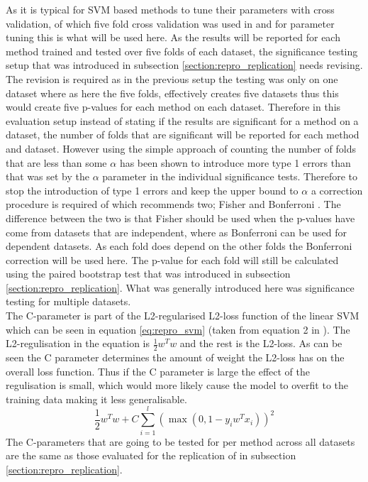 As it is typical for SVM based methods to tune their parameters with cross validation, of which five fold cross validation was used in \citet{vo2015target} and \citet{wang-etal-2017-tdparse} for parameter tuning this is what will be used here. As the results will be reported for each method trained and tested over five folds of each dataset, the significance testing setup that was introduced in subsection \ref{section:repro_replication} needs revising. The revision is required as in the previous setup the testing was only on one dataset where as here the five folds, effectively creates five datasets thus this would create five p-values for each method on each dataset. Therefore in this evaluation setup instead of stating if the results are significant for a method on a dataset, the number of folds that are significant will be reported for each method and dataset. However using the simple approach of counting the number of folds that are less than some $\alpha$ has been shown to introduce more type 1 errors \citep{dror-etal-2017-replicability} than that was set by the $\alpha$ parameter in the individual significance tests. Therefore to stop the introduction of type 1 errors and keep the upper bound to $\alpha$ a correction procedure is required of which \citet{dror-etal-2018-hitchhikers} recommends two; Fisher and Bonferroni \citep{benjamini2008screening}. The difference between the two is that Fisher should be used when the p-values have come from datasets that are independent, where as Bonferroni can be used for dependent datasets. As each fold does depend on the other folds the Bonferroni correction will be used here. The p-value for each fold will still be calculated using the paired bootstrap test that was introduced in subsection \ref{section:repro_replication}. What was generally introduced here was significance testing for multiple datasets.\\

The C-parameter is part of the L2-regularised L2-loss function of the linear SVM which can be seen in equation \ref{eq:repro_svm} (taken from equation 2 in \citep{fan2008liblinear}). The L2-regulisation in the equation is $\frac{1}{2}w^Tw$ and the rest is the L2-loss. As can be seen the C parameter determines the amount of weight the L2-loss has on the overall loss function. Thus if the C parameter is large the effect of the regulisation is small, which would more likely cause the model to overfit to the training data making it less generalisable.
\begin{equation}
    \frac{1}{2}w^{T}w + C\sum_{i=1}^{l}(\max(0, 1 - y_{i}w^{T}x_i))^2
    \label{eq:repro_svm}
\end{equation}
The C-parameters that are going to be tested for per method across all datasets are the same as those evaluated for the replication of \citet{wang-etal-2017-tdparse} in subsection \ref{section:repro_replication}. 

